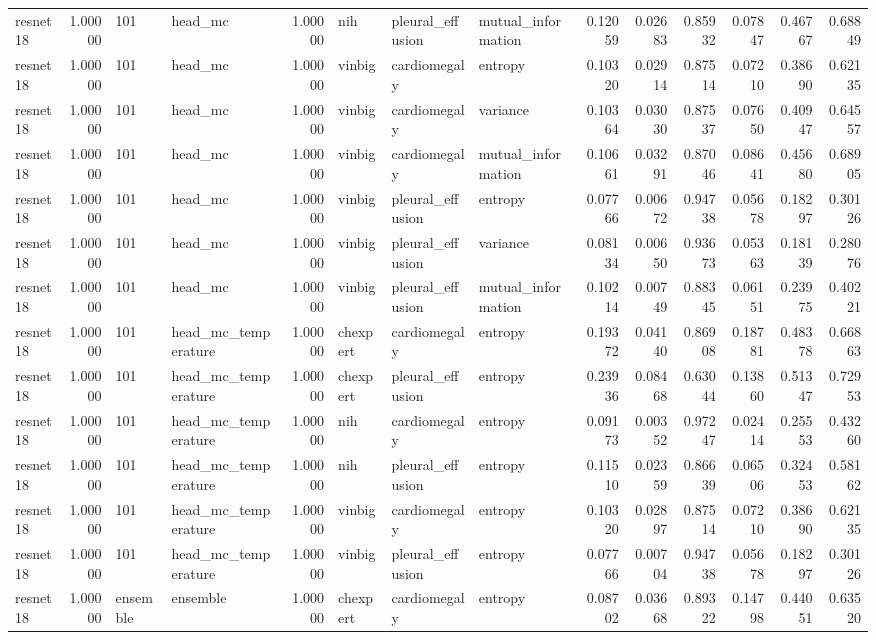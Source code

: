 \begin{tabular}{lrllrlllrrrrrr}
resnet18 & 1.00000 & 101 & head\_mc & 1.00000 & nih & pleural\_effusion & mutual\_information & 0.12059 & 0.02683 & 0.85932 & 0.07847 & 0.46767 & 0.68849 \\
resnet18 & 1.00000 & 101 & head\_mc & 1.00000 & vinbig & cardiomegaly & entropy & 0.10320 & 0.02914 & 0.87514 & 0.07210 & 0.38690 & 0.62135 \\
resnet18 & 1.00000 & 101 & head\_mc & 1.00000 & vinbig & cardiomegaly & variance & 0.10364 & 0.03030 & 0.87537 & 0.07650 & 0.40947 & 0.64557 \\
resnet18 & 1.00000 & 101 & head\_mc & 1.00000 & vinbig & cardiomegaly & mutual\_information & 0.10661 & 0.03291 & 0.87046 & 0.08641 & 0.45680 & 0.68905 \\
resnet18 & 1.00000 & 101 & head\_mc & 1.00000 & vinbig & pleural\_effusion & entropy & 0.07766 & 0.00672 & 0.94738 & 0.05678 & 0.18297 & 0.30126 \\
resnet18 & 1.00000 & 101 & head\_mc & 1.00000 & vinbig & pleural\_effusion & variance & 0.08134 & 0.00650 & 0.93673 & 0.05363 & 0.18139 & 0.28076 \\
resnet18 & 1.00000 & 101 & head\_mc & 1.00000 & vinbig & pleural\_effusion & mutual\_information & 0.10214 & 0.00749 & 0.88345 & 0.06151 & 0.23975 & 0.40221 \\
resnet18 & 1.00000 & 101 & head\_mc\_temperature & 1.00000 & chexpert & cardiomegaly & entropy & 0.19372 & 0.04140 & 0.86908 & 0.18781 & 0.48378 & 0.66863 \\
resnet18 & 1.00000 & 101 & head\_mc\_temperature & 1.00000 & chexpert & pleural\_effusion & entropy & 0.23936 & 0.08468 & 0.63044 & 0.13860 & 0.51347 & 0.72953 \\
resnet18 & 1.00000 & 101 & head\_mc\_temperature & 1.00000 & nih & cardiomegaly & entropy & 0.09173 & 0.00352 & 0.97247 & 0.02414 & 0.25553 & 0.43260 \\
resnet18 & 1.00000 & 101 & head\_mc\_temperature & 1.00000 & nih & pleural\_effusion & entropy & 0.11510 & 0.02359 & 0.86639 & 0.06506 & 0.32453 & 0.58162 \\
resnet18 & 1.00000 & 101 & head\_mc\_temperature & 1.00000 & vinbig & cardiomegaly & entropy & 0.10320 & 0.02897 & 0.87514 & 0.07210 & 0.38690 & 0.62135 \\
resnet18 & 1.00000 & 101 & head\_mc\_temperature & 1.00000 & vinbig & pleural\_effusion & entropy & 0.07766 & 0.00704 & 0.94738 & 0.05678 & 0.18297 & 0.30126 \\
resnet18 & 1.00000 & ensemble & ensemble & 1.00000 & chexpert & cardiomegaly & entropy & 0.08702 & 0.03668 & 0.89322 & 0.14798 & 0.44051 & 0.63520 \\

\end{tabular}
